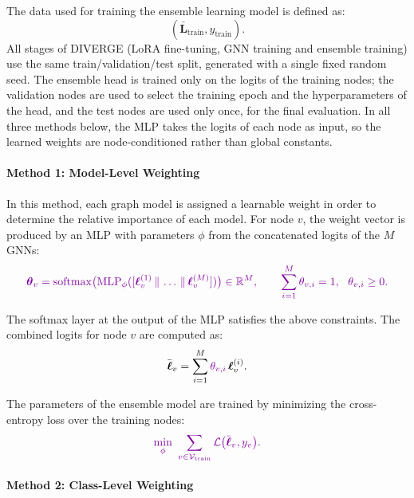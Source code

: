 \documentclass[a4paper,fleqn]{cas-sc}
\DeclareRobustCommand{\revcommon}[2][]{\textcolor{revshared}{#2}} %
\begin{document}
The data used for training the ensemble learning model is defined as:
\begin{equation}
(\bar{\mathbf{L}}_{\text{train}}, y_{\text{train}}).
\end{equation}
\revcommon[R1,R4]{All stages of DIVERGE (LoRA fine-tuning, GNN training and ensemble training) use the same train/validation/test split, generated with a single fixed random seed. The ensemble head is trained only on the logits of the training nodes; the validation nodes are used to select the training epoch and the hyperparameters of the head, and the test nodes are used only once, for the final evaluation. In all three methods below, the MLP takes the logits of each node as input, so the learned weights are node-conditioned rather than global constants.}

\paragraph{Method 1: Model-Level Weighting}

In this method, each graph model is assigned a learnable weight in order to determine the relative importance of each model. \revcommon[R1,R4]{For node $v$, the weight vector is produced by an MLP with parameters $\phi$ from the concatenated logits of the $M$ GNNs:}
\begin{equation}
\revcommon[R1,R4]{\boldsymbol{\theta}_v=\mathrm{softmax}\big(\mathrm{MLP}_{\phi}([\boldsymbol{\ell}^{(1)}_{v}\,\|\,\dots\,\|\,\boldsymbol{\ell}^{(M)}_{v}])\big)\in\mathbb{R}^{M}, \qquad \sum_{i=1}^{M}\theta_{v,i}=1,\ \ \theta_{v,i}\ge 0.}
\end{equation}

The softmax layer at the output of the MLP satisfies the above constraints. The combined logits for node $v$ are computed as:
\begin{equation}
\bar{\boldsymbol{\ell}}_{v}=\sum_{i=1}^{M}\revcommon[R1,R4]{\theta_{v,i}}\,\boldsymbol{\ell}^{(i)}_{v}.
\end{equation}

The parameters of the ensemble model are trained by minimizing the \revcommon[R1,R4]{cross-entropy loss over the training nodes}:
\begin{equation}
\revcommon[R1,R4]{\min_{\phi}\ \sum_{v\in\mathcal{V}_{\text{train}}}\mathcal{L}\big(\bar{\boldsymbol{\ell}}_{v},y_v\big).}
\end{equation}

\paragraph{Method 2: Class-Level Weighting}
\end{document}
